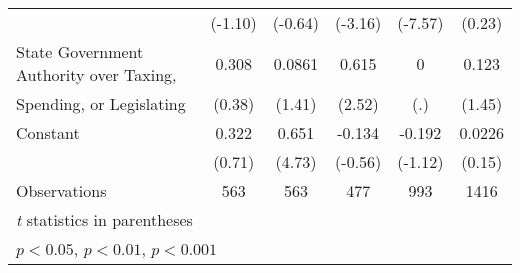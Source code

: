 {\begin{tabular}{l*{5}{c}}
                                        &   (-1.10)         &   (-0.64)         &   (-3.16)         &   (-7.57)         &    (0.23)         \\
\addlinespace
State Government Authority over Taxing, &     0.308         &    0.0861         &     0.615\sym{*}  &         0         &     0.123         \\
Spending, or Legislating                &    (0.38)         &    (1.41)         &    (2.52)         &       (.)         &    (1.45)         \\
\addlinespace
Constant                                &     0.322         &     0.651\sym{***}&    -0.134         &    -0.192         &    0.0226         \\
                                        &    (0.71)         &    (4.73)         &   (-0.56)         &   (-1.12)         &    (0.15)         \\
\midrule
Observations                            &       563         &       563         &       477         &       993         &      1416         \\
\bottomrule
\multicolumn{6}{l}{\footnotesize \textit{t} statistics in parentheses}\\
\multicolumn{6}{l}{\footnotesize \sym{*} \(p<0.05\), \sym{**} \(p<0.01\), \sym{***} \(p<0.001\)}\\
\end{tabular}
}
